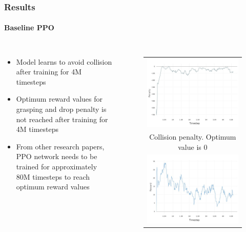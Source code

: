 \documentclass{beamer}
\begin{document}
	\begin{frame}
		\frametitle{Results}
		\framesubtitle{Baseline PPO}
		\vspace{-2em}
		\begin{columns}[c]
			\begin{itemize}
				\item Model learns to avoid collision after training for 4M timesteps
				\item Optimum reward values for grasping and drop penalty is not reached after training for 4M timesteps
				\item From other research papers, PPO network needs to be trained for approximately
				80M timesteps to reach optimum reward values
			\end{itemize}
			
			\begin{figure}
				\begin{tabular}{c}
					\includegraphics[scale=0.65]{ppo-simulation-collision-penalty.jpeg} \\
					{\small Collision penalty. Optimum value is 0} \\ \includegraphics[scale=0.65]{ppo-simulation-grasp-reward.jpeg} \\

\end{tabular}
\end{figure}
\end{columns}
\end{frame}
\end{document}
